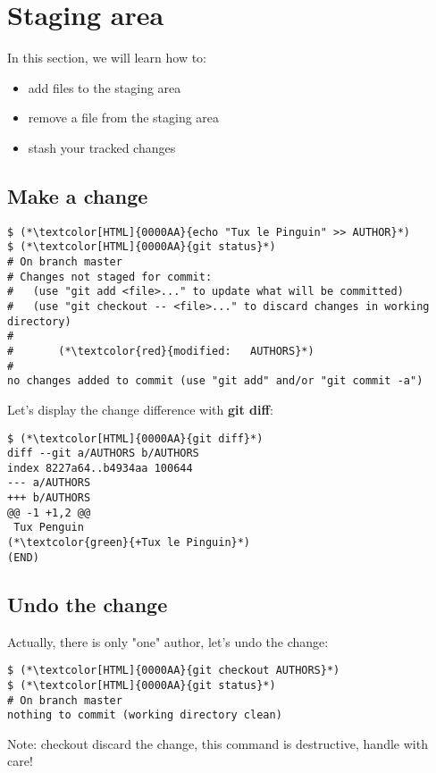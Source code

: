 \section{Staging area}
\begin{frame}[fragile]
  \slidetitle

  In this section, we will learn how to:
  \begin{itemize}
    \item add files to the staging area
    \item remove a file from the staging area
    \item stash your tracked changes
  \end{itemize}
\end{frame}

\subsection{Make a change}
\begin{frame}[fragile]
\subslidetitle
\begin{lstlisting}
$ (*\textcolor[HTML]{0000AA}{echo "Tux le Pinguin" >> AUTHOR}*)
$ (*\textcolor[HTML]{0000AA}{git status}*)
# On branch master
# Changes not staged for commit:
#   (use "git add <file>..." to update what will be committed)
#   (use "git checkout -- <file>..." to discard changes in working directory)
#
#       (*\textcolor{red}{modified:   AUTHORS}*)
#
no changes added to commit (use "git add" and/or "git commit -a")
\end{lstlisting}

Let's display the change difference with \textbf{git diff}:

\begin{lstlisting}
$ (*\textcolor[HTML]{0000AA}{git diff}*)
diff --git a/AUTHORS b/AUTHORS
index 8227a64..b4934aa 100644
--- a/AUTHORS
+++ b/AUTHORS
@@ -1 +1,2 @@
 Tux Penguin
(*\textcolor{green}{+Tux le Pinguin}*)
(END)
\end{lstlisting}

\end{frame}

\subsection{Undo the change}
\begin{frame}[fragile]
\subslidetitle

Actually, there is only "one" author, let's undo the change:

\begin{lstlisting}
$ (*\textcolor[HTML]{0000AA}{git checkout AUTHORS}*)
$ (*\textcolor[HTML]{0000AA}{git status}*)
# On branch master
nothing to commit (working directory clean)
\end{lstlisting}

Note: checkout discard the change, this command is destructive, handle with care!

\end{frame}

